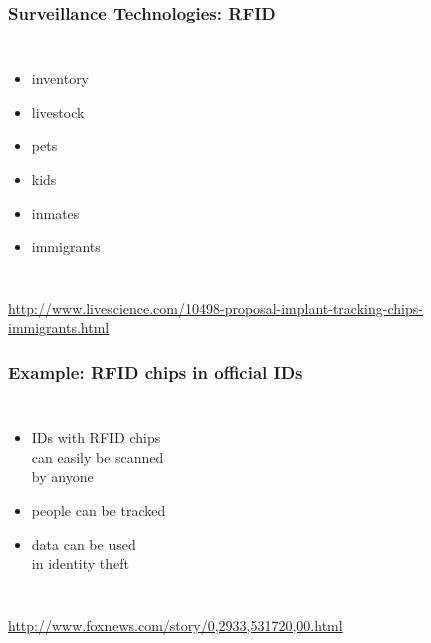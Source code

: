 \documentclass[dvipsnames]{beamer}
\theoremstyle{plain}
\begin{document}
\begin{frame}
  \frametitle{Surveillance Technologies: RFID}

  \begin{columns}
    \begin{itemize}
      \item inventory
      \item livestock

      \pause
      \medskip
      \item pets
      \item kids
      \item inmates
      \item immigrants
    \end{itemize}

  \end{columns}

  \medskip
  \tiny{\url{http://www.livescience.com/10498-proposal-implant-tracking-chips-immigrants.html}}\\
\end{frame}

\begin{frame}
  \frametitle{Example: RFID chips in official IDs}

  \begin{columns}

    \begin{itemize}
      \item IDs with RFID chips\\
        can easily be scanned\\
        by anyone
      \item people can be tracked
      \item data can be used\\
        in identity theft
    \end{itemize}
  \end{columns}

  \medskip
  \tiny{\url{http://www.foxnews.com/story/0,2933,531720,00.html}}\\
\end{frame}
\end{document}
